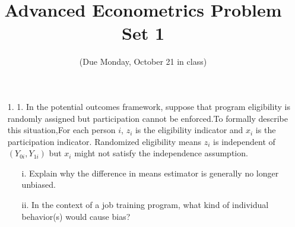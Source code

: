 \documentclass{article}
\title{Advanced Econometrics Problem Set 1}
\author{}
\date{(Due Monday, October 21 in class)}
\begin{document}
\maketitle

\begin{enumerate}
    \item[1.]1. In the potential outcomes framework, suppose that program eligibility is randomly assigned but participation cannot be enforced.To formally describe this situation,For each person \(i\), \(z_{i}\) is the eligibility indicator and \(x_{i}\) is the participation indicator. Randomized eligibility means \(z_{i}\) is independent of \((Y_{0i}, Y_{1i})\) but \(x_{i}\) might not satisfy the independence assumption.
    \begin{itemize}
        \item[i.] Explain why the difference in means estimator is generally no longer unbiased.
        \item[ii.] In the context of a job training program, what kind of individual behavior(s) would cause bias?
    \end{itemize}









\end{enumerate}
\end{document}
